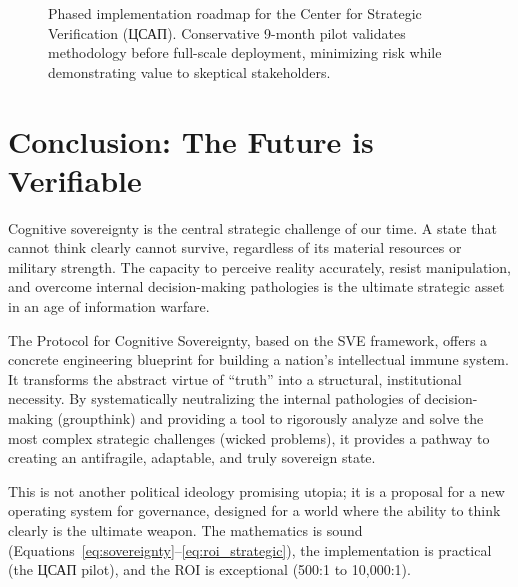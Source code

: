 \documentclass[11pt,a4paper]{article}
\begin{document}
\begin{small}
\begin{figure}[h!]
\caption{Phased implementation roadmap for the Center for Strategic Verification (ЦСАП). Conservative 9-month pilot validates methodology before full-scale deployment, minimizing risk while demonstrating value to skeptical stakeholders.}
\label{fig:implementation}
\end{figure}

\section{Conclusion: The Future is Verifiable}
Cognitive sovereignty is the central strategic challenge of our time. A state that cannot think clearly cannot survive, regardless of its material resources or military strength. The capacity to perceive reality accurately, resist manipulation, and overcome internal decision-making pathologies is the ultimate strategic asset in an age of information warfare.

The Protocol for Cognitive Sovereignty, based on the SVE framework, offers a concrete engineering blueprint for building a nation's intellectual immune system. It transforms the abstract virtue of ``truth'' into a structural, institutional necessity. By systematically neutralizing the internal pathologies of decision-making (groupthink) and providing a tool to rigorously analyze and solve the most complex strategic challenges (wicked problems), it provides a pathway to creating an antifragile, adaptable, and truly sovereign state.

This is not another political ideology promising utopia; it is a proposal for a new operating system for governance, designed for a world where the ability to think clearly is the ultimate weapon. The mathematics is sound (Equations~\eqref{eq:sovereignty}--\eqref{eq:roi_strategic}), the implementation is practical (the ЦСАП pilot), and the ROI is exceptional (500:1 to 10,000:1).


\end{small}
\end{document}
